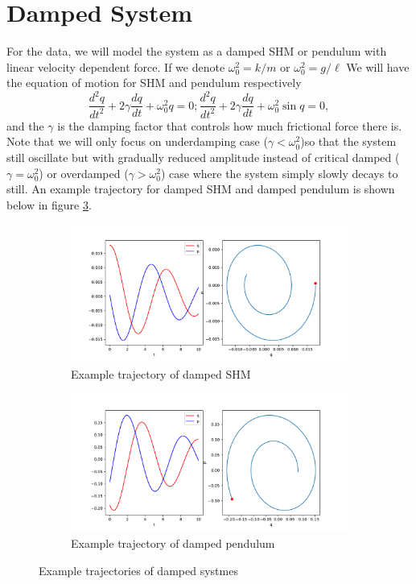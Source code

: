 \documentclass{statsmsc}
\begin{document}
\section{Damped System}
For the data, we will model the system as a damped SHM or pendulum with linear velocity dependent force.
If we denote $\omega_0^2=k/m$ or $\omega_0^2=g/\ell$
We will have the equation of motion for SHM and pendulum respectively
$$
\frac{d^2q}{dt^2}+2\gamma\frac{dq}{dt}+\omega_0^2q=0; \frac{d^2q}{dt^2}+2\gamma\frac{dq}{dt}+\omega_0^2\sin q=0 ,
$$
and the $\gamma$ is the damping factor that controls how much frictional force there is. 
Note that we will only focus on underdamping case ($\gamma < \omega_0^2$)so that the system still oscillate but with gradually reduced amplitude instead of critical damped ($\gamma=\omega_0^2$) or overdamped ($\gamma>\omega_0^2$) case where the system simply slowly decays to still.
An example trajectory for damped SHM and damped pendulum is shown below in figure \ref{fig:damped_trajectory}.

\begin{figure}[H]
     \centering
     \begin{subfigure}[b]{\linewidth}
        \centering
        \includegraphics[width=0.5\linewidth]{../codes/figures/damped_shm_trajectory_1D.pdf}
        \caption{Example trajectory of damped SHM}
        \label{fig:damped_shm_trajectory}
     \end{subfigure}
     \hfill
     \begin{subfigure}[b]{\linewidth}
        \centering
        \includegraphics[width=0.5\linewidth]{../codes/figures/damped_pendulum_trajectory_1D.pdf}
        \caption{Example trajectory of damped pendulum}
        \label{fig:damped_pendulum_trajectory}
     \end{subfigure}
        \caption{Example trajectories of damped systmes}
        \label{fig:damped_trajectory}
\end{figure}
\end{document}
